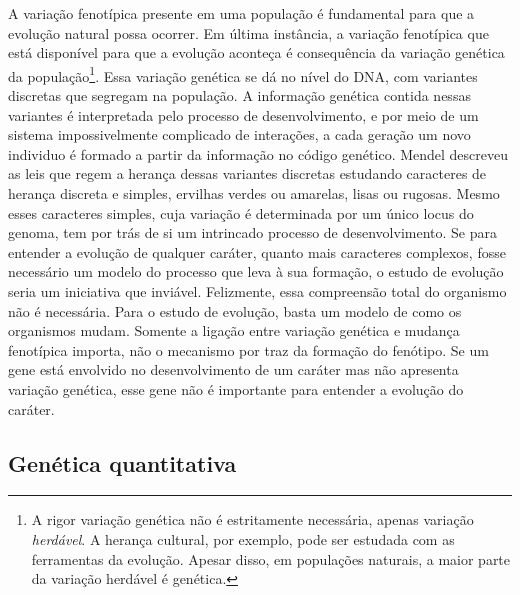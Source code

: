 \begin{refsection}
A variação fenotípica presente em uma população é fundamental para que a
evolução natural possa ocorrer. Em última instância, a variação fenotípica que
está disponível para que a evolução aconteça é consequência da variação
genética da população\footnote{A rigor variação genética não é estritamente
necessária, apenas variação \textit{herdável}. A herança cultural, por exemplo, pode
ser estudada com as ferramentas da evolução. Apesar disso, em populações
naturais, a maior parte da variação herdável é genética.}. Essa variação
genética se dá no nível do DNA, com variantes discretas que segregam na
população. A informação genética contida nessas variantes é interpretada pelo
processo de desenvolvimento, e por meio de um sistema impossivelmente
complicado de interações, a cada geração um novo individuo é formado a partir
da informação no código genético. Mendel descreveu as leis que regem a herança
dessas variantes discretas estudando caracteres de herança discreta e simples,
ervilhas verdes ou amarelas, lisas ou rugosas. Mesmo esses caracteres simples,
cuja variação é determinada por um único locus do genoma, tem por trás de si
um intrincado processo de desenvolvimento. Se para entender a evolução de
qualquer caráter, quanto mais caracteres complexos, fosse necessário um modelo
do processo que leva à sua formação, o estudo de evolução seria um iniciativa
que inviável. Felizmente, essa compreensão total do organismo não é
necessária. Para o estudo de evolução, basta um modelo de como os organismos
mudam. Somente a ligação entre variação genética e mudança fenotípica importa,
não o mecanismo por traz da formação do fenótipo. Se um gene está envolvido no
desenvolvimento de um caráter mas não apresenta variação genética, esse gene
não é importante para entender a evolução do caráter.

\subsection{Genética quantitativa} 


\end{refsection}

